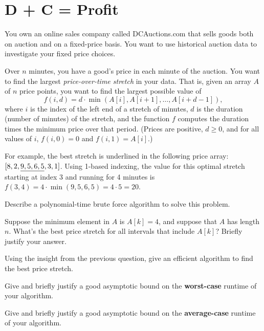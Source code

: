 \section{D + C = Profit}

You own an online sales company called DCAuctions.com that sells goods both on auction and on a fixed-price basis. You want to use historical auction data to investigate your fixed price choices.
	
	Over $n$ minutes, you have a good's price in each minute of the auction. You want to find the largest \textit{price-over-time stretch} in your data. That is, given an array $A$ of $n$ price points, you want to find the largest possible value of
	$$
	f(i,d) = d \cdot \min(A[i], A[i+1], \ldots, A[i+d-1]),
	$$
	where $i$ is the index of the left end of a stretch of minutes, $d$ is the duration (number of minutes) of the stretch, and the function $f$ computes the duration times the minimum price over that period. (Prices are positive, $d \ge 0$, and for all values of $i$, $f(i,0) = 0$ and $f(i,1) = A[i]$.)
	
	For example, the best stretch is underlined in the following price array: $[8, 2, \uline{9, 5, 6, 5}, 3, 1]$. Using 1-based indexing, the value for this optimal stretch starting at index 3 and running for 4 minutes is $f(3,4) = 4 \cdot \min(9,5,6,5) = 4 \cdot 5 = 20$.

 \begin{questions}
    \question[2] Describe a polynomial-time brute force algorithm to solve this problem.

    \ifsolutions\fi 
 
     \question[1] Suppose the minimum element in $A$ is $A[k]=4$, and suppose that $A$ has length $n$. What's the best price stretch for all intervals that include $A[k]$? Briefly justify your answer.

     \ifsolutions\fi 

     \question[5] Using the insight from the previous question, give an efficient algorithm to find the best price stretch.

     \ifsolutions\fi 

     \question[2] Give and briefly justify a good asymptotic bound on the \textbf{worst-case} runtime of your algorithm.

     \ifsolutions\fi 

     \question[2] Give and briefly justify a good asymptotic bound on the \textbf{average-case} runtime of your algorithm.

     \ifsolutions\fi 
     
 \end{questions}